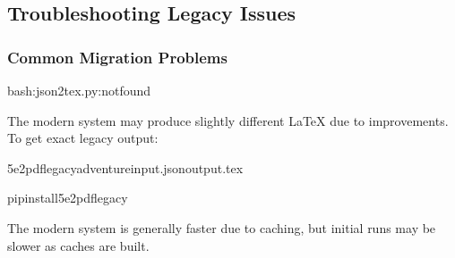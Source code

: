 \documentclass[letterpaper,10pt,english]{sphinxmanual}
\begin{document}
\subsection{Troubleshooting Legacy Issues}
\label{\detokenize{developer/legacy:troubleshooting-legacy-issues}}

\subsubsection{Common Migration Problems}
\label{\detokenize{developer/legacy:common-migration-problems}}
\sphinxAtStartPar
{}

\begin{sphinxVerbatim}[commandchars=\\\{\}]
bash:json2tex.py:notfound

\end{sphinxVerbatim}

\sphinxAtStartPar
{}

\sphinxAtStartPar
The modern system may produce slightly different LaTeX due to improvements. To get exact legacy output:

\begin{sphinxVerbatim}[commandchars=\\\{\}]
5e2pdflegacy\PYGZhy{}\PYGZhy{}adventureinput.json\PYGZgt{}output.tex
\end{sphinxVerbatim}

\sphinxAtStartPar
{}

\begin{sphinxVerbatim}[commandchars=\\\{\}]
pipinstall5e2pdf\PYG{o}{[}legacy\PYG{o}{]}
\end{sphinxVerbatim}

\sphinxAtStartPar
{}

\sphinxAtStartPar
The modern system is generally faster due to caching, but initial runs may be slower as caches are built.
\end{document}
